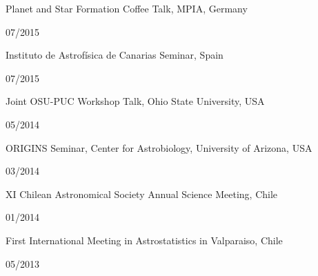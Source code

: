 \documentclass[11pt, a4paper]{article} %
\begin{document}
\begin{minipage}[t]{0.7\textwidth}
\begin{flushleft}%
  \setlength{\leftskip}{0.2cm}%
Planet and Star Formation Coffee Talk, MPIA, Germany
\end{flushleft}
\end{minipage}
\begin{minipage}[t]{0.3\textwidth}
\hfill 07/2015
\end{minipage}

\begin{minipage}[t]{0.7\textwidth}
\begin{flushleft}%
  \setlength{\leftskip}{0.2cm}%
Instituto de Astrof\'isica de Canarias Seminar, Spain
\end{flushleft}
\end{minipage}
\begin{minipage}[t]{0.3\textwidth}
\hfill 07/2015
\end{minipage}
\begin{minipage}[t]{0.7\textwidth}
\begin{flushleft}%
  \setlength{\leftskip}{0.2cm}%
Joint OSU-PUC Workshop Talk, Ohio State University, USA
\end{flushleft}
\end{minipage}
\begin{minipage}[t]{0.3\textwidth}
\hfill 05/2014
\end{minipage}

\begin{minipage}[t]{0.7\textwidth}
\begin{flushleft}%
  \setlength{\leftskip}{0.2cm}%
ORIGINS Seminar, Center for Astrobiology, University of Arizona, USA
\end{flushleft}
\end{minipage}
\begin{minipage}[t]{0.3\textwidth}
\hfill 03/2014
\end{minipage}

\begin{minipage}[t]{0.7\textwidth}
\begin{flushleft}%
  \setlength{\leftskip}{0.2cm}%
XI Chilean Astronomical Society Annual Science Meeting, Chile 
\end{flushleft}
\end{minipage}
\begin{minipage}[t]{0.3\textwidth}
\hfill 01/2014
\end{minipage}

\begin{minipage}[t]{0.7\textwidth}
\begin{flushleft}%
  \setlength{\leftskip}{0.2cm}%
First International Meeting in Astrostatistics in Valparaiso, Chile 
\end{flushleft}
\end{minipage}
\begin{minipage}[t]{0.3\textwidth}
\hfill 05/2013
\end{minipage}
\end{document}
